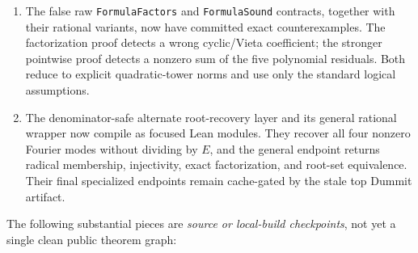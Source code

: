 \documentclass[11pt,a4paper,oneside]{article}
\newcommand{\lean}[1]{\nolinkurl{#1}}
\begin{document}
\begin{enumerate}
  hypothetical basis degree counts $1,0,2,5,8,11,17,16$.  The tower-coordinate
  layer splits a degree-seven invariant into zero and positive elementary
  exponent parts, shows that the positive part vanishes in the literal
  quotient, and puts every residue in the span of the sixteen forced vectors.
  Applying this to the seventeen independent certified classes proves
  \lean{no_lazardHomogeneousInvariantBasis}.  The endpoint audit is exactly
  \lean{[propext, Classical.choice, Quot.sound]}.
\item The false raw \lean{FormulaFactors} and \lean{FormulaSound} contracts,
  together with their rational variants, now have committed exact
  counterexamples.  The factorization proof detects a wrong cyclic/Vieta
  coefficient; the stronger pointwise proof detects a nonzero sum of the five
  polynomial residuals.  Both reduce to explicit quadratic-tower norms and
  use only the standard logical assumptions.
\item The denominator-safe alternate root-recovery layer and its general
  rational wrapper now compile as focused Lean modules.  They recover all
  four nonzero Fourier modes without dividing by $E$, and the general endpoint
  returns radical membership, injectivity, exact factorization, and root-set
  equivalence.  Their final specialized endpoints remain cache-gated by the
  stale top Dummit artifact.
\end{enumerate}

The following substantial pieces are \emph{source or local-build
checkpoints}, not yet a single clean public theorem graph:
\end{document}
